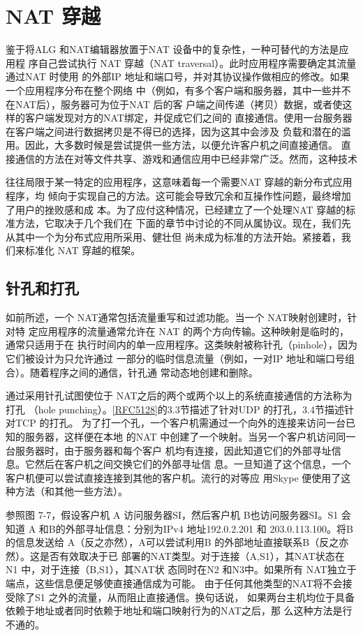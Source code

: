 \section{NAT 穿越}

鉴于将ALG 和NAT编辑器放置于NAT 设备中的复杂性，一种可替代的方法是应用程
序自己尝试执行 NAT 穿越（NAT traversal）。此时应用程序需要确定其流量通过NAT 时使用
的外部IP 地址和端口号，并对其协议操作做相应的修改。如果一个应用程序分布在整个网络
中（例如，有多个客户端和服务器，其中一些并不在NAT后），服务器可为位于NAT 后的客
户端之间传递（拷贝）数据，或者使这样的客户端发现对方的NAT绑定，并促成它们之间的
直接通信。使用一台服务器在客户端之间进行数据拷贝是不得已的选择，因为这其中会涉及
负载和潜在的滥用。因此，大多数时候是尝试提供一些方法，以便允许客户机之间直接通信。
直接通信的方法在对等文件共享、游戏和通信应用中已经非常广泛。然而，这种技术

往往局限于某一特定的应用程序，这意味着每一个需要NAT 穿越的新分布式应用程序，均
倾向于实现自己的方法。这可能会导致冗余和互操作性问题，最终增加了用户的挫败感和成
本。为了应付这种情况，已经建立了一个处理NAT 穿越的标准方法，它取决于几个我们在
下面的章节中讨论的不同从属协议。现在，我们先从其中一个为分布式应用所采用、健壮但
尚未成为标准的方法开始。紧接着，我们来标准化 NAT 穿越的框架。

\subsection{针孔和打孔}

如前所述，一个 NAT通常包括流量重写和过滤功能。当一个 NAT映射创建时，针对特
定应用程序的流量通常允许在 NAT 的两个方向传输。这种映射是临时的，通常只适用于在
执行时间内的单一应用程序。这类映射被称针孔（pinhole），因为它们被设计为只允许通过
一部分的临时信息流量（例如，一对IP 地址和端口号组合）。随着程序之间的通信，针孔通
常动态地创建和删除。

通过采用针孔试图使位于 NAT之后的两个或两个以上的系统直接通信的方法称为打孔
（hole punching）。\href{https://www.rfc-editor.org/rfc/rfc5128}{[RFC5128]}的3.3节描述了针对UDP 的打孔，3.4节描述针对TCP 的打孔。
为了打一个孔，一个客户机需通过一个向外的连接来访问一台已知的服务器，这样便在本地
的NAT 中创建了一个映射。当另一个客户机访问同一台服务器时，由于服务器和每个客户
机均有连接，因此知道它们的外部寻址信息。它然后在客户机之间交换它们的外部寻址信
息。一旦知道了这个信息，一个客户机便可以尝试直接连接到其他的客户机。流行的对等应
用Skype 便使用了这种方法（和其他一些方法）。

参照图 7-7，假设客户机 A 访问服务器SI，然后客户机 B也访问服务器SI。S1 会知道
A 和B的外部寻址信息：分别为IPv4 地址192.0.2.201 和 203.0.113.100。将B 的信息发送给
A（反之亦然），A可以尝试利用B 的外部地址直接联系B（反之亦然）。这是否有效取决于已
部署的NAT类型。对于连接（A,S1），其NAT状态在 N1 中，对于连接（B,S1），其NAT状
态同时在N2 和N3中。如果所有 NAT独立于端点，这些信息便足够使直接通信成为可能。
由于任何其他类型的NAT将不会接受除了S1 之外的流量，从而阻止直接通信。换句话说，
如果两台主机均位于具备依赖于地址或者同时依赖于地址和端口映射行为的NAT之后，那
么这种方法是行不通的。

